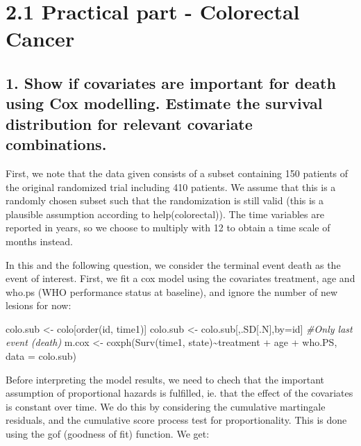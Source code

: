 \documentclass[
  11pt,
]{article}
\author{}
\date{\vspace{-2.5em}}
\newenvironment{Shaded}{\begin{snugshade}}{\end{snugshade}}
\newcommand{\AttributeTok}[1]{\textcolor[rgb]{0.77,0.63,0.00}{#1}}
\newcommand{\CommentTok}[1]{\textcolor[rgb]{0.56,0.35,0.01}{\textit{#1}}}
\newcommand{\FunctionTok}[1]{\textcolor[rgb]{0.00,0.00,0.00}{#1}}
\newcommand{\NormalTok}[1]{#1}
\newcommand{\OtherTok}[1]{\textcolor[rgb]{0.56,0.35,0.01}{#1}}
\newcommand{\SpecialCharTok}[1]{\textcolor[rgb]{0.00,0.00,0.00}{#1}}
\begin{document}
\hypertarget{practical-part---colorectal-cancer}{%
\section{2.1 Practical part - Colorectal
Cancer}\label{practical-part---colorectal-cancer}}

\hypertarget{show-if-covariates-are-important-for-death-using-cox-modelling.-estimate-the-survival-distribution-for-relevant-covariate-combinations.}{%
\subsection{1. Show if covariates are important for death using Cox
modelling. Estimate the survival distribution for relevant covariate
combinations.}\label{show-if-covariates-are-important-for-death-using-cox-modelling.-estimate-the-survival-distribution-for-relevant-covariate-combinations.}}

First, we note that the data given consists of a subset containing 150
patients of the original randomized trial including 410 patients. We
assume that this is a randomly chosen subset such that the randomization
is still valid (this is a plausible assumption according to
help(colorectal)). The time variables are reported in years, so we
choose to multiply with 12 to obtain a time scale of months instead.

In this and the following question, we consider the terminal event death
as the event of interest. First, we fit a cox model using the covariates
treatment, age and who.ps (WHO performance status at baseline), and
ignore the number of new lesions for now:

\begin{Shaded}
\begin{Highlighting}[]
\NormalTok{colo.sub }\OtherTok{\textless{}{-}}\NormalTok{ colo[}\FunctionTok{order}\NormalTok{(id, time1)]}
\NormalTok{colo.sub }\OtherTok{\textless{}{-}}\NormalTok{ colo.sub[,.SD[.N],by}\OtherTok{=}\NormalTok{id] }\CommentTok{\#Only last event (death)}
\NormalTok{m.cox }\OtherTok{\textless{}{-}} \FunctionTok{coxph}\NormalTok{(}\FunctionTok{Surv}\NormalTok{(time1, state)}\SpecialCharTok{\textasciitilde{}}\NormalTok{treatment }\SpecialCharTok{+}\NormalTok{ age }\SpecialCharTok{+}\NormalTok{ who.PS, }\AttributeTok{data =}\NormalTok{ colo.sub)}
\end{Highlighting}
\end{Shaded}

Before interpreting the model results, we need to chech that the
important assumption of proportional hazards is fulfilled, ie. that the
effect of the covariates is constant over time. We do this by
considering the cumulative martingale residuals, and the cumulative
score process test for proportionality. This is done using the gof
(goodness of fit) function. We get:
\end{document}
